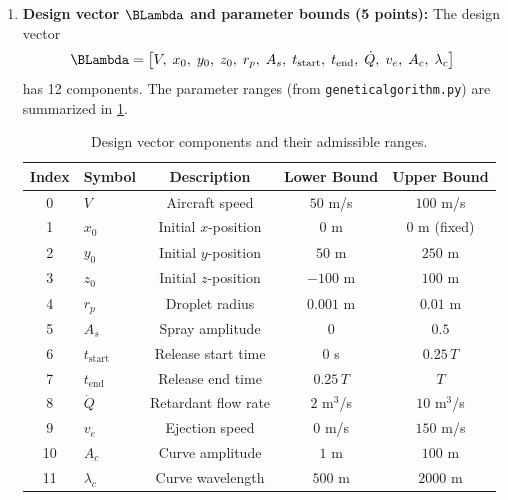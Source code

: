 \documentclass{article}
\begin{document}
\begin{enumerate}
\item[2. (a)] \textbf{Design vector $\BLambda$ and parameter bounds (5 points):}
The design vector
\begin{equation}
    \BLambda = \bigl[V,\; x_0,\; y_0,\; z_0,\; r_p,\; A_s,\; t_\text{start},\; t_\text{end},\; \dot{Q},\; v_e,\; A_c,\; \lambda_c\bigr]
    \label{eq:lam}
\end{equation}
has 12 components.
The parameter ranges (from \texttt{geneticalgorithm.py}) are summarized in \cref{tab:lam}.

\begin{table}[H]
\centering
\caption{Design vector components and their admissible ranges.}
\label{tab:lam}
\begin{tabular}{clccc}
\toprule
Index & Symbol & Description & Lower Bound & Upper Bound \\
\midrule
0  & $V$             & Aircraft speed              & $50$ m/s & $100$ m/s \\
1  & $x_0$           & Initial $x$-position        & $0$ m              & $0$ m (fixed)       \\
2  & $y_0$           & Initial $y$-position        & $50$ m              & $250$ m             \\
3  & $z_0$           & Initial $z$-position        & $-100$ m           & $100$ m             \\
4  & $r_p$           & Droplet radius              & $0.001$ m          & $0.01$ m            \\
5  & $A_s$           & Spray amplitude             & $0$                & $0.5$               \\
6  & $t_\text{start}$& Release start time          & $0$ s              & $0.25\,T$           \\
7  & $t_\text{end}$  & Release end time            & $0.25\,T$          & $T$                 \\
8  & $\dot{Q}$       & Retardant flow rate         & $2$ m$^3$/s        & $10$ m$^3$/s        \\
9  & $v_e$           & Ejection speed              & $0$ m/s            & $150$ m/s           \\
10 & $A_c$           & Curve amplitude             & $1$ m              & $100$ m             \\
11 & $\lambda_c$     & Curve wavelength            & $500$ m            & $2000$ m            \\
\bottomrule
\end{tabular}
\end{table}


\end{enumerate}
\end{document}
